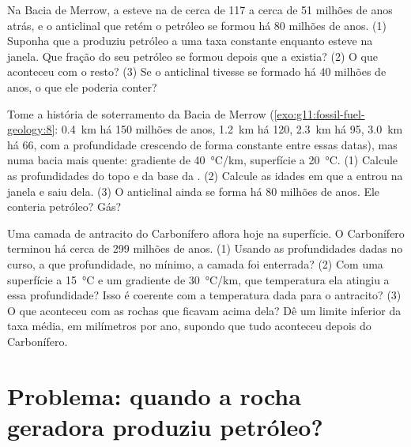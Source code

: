 \begin{exercise}[$\star\star\star$]\label{exo:g11:fossil-fuel-geology:13}
Na Bacia de Merrow, a  esteve na  de cerca
de 117 a cerca de 51 milhões de anos atrás, e o anticlinal que retém o
petróleo se formou há 80 milhões de anos. (1) Suponha que a 
produziu petróleo a uma taxa constante enquanto esteve na janela. Que fração
do seu petróleo se formou depois que a  existia? (2) O que
aconteceu com o resto? (3) Se o anticlinal tivesse se formado há 40 milhões
de anos, o que ele poderia conter?
\end{exercise}

\begin{exercise}[$\star\star\star$]\label{exo:g11:fossil-fuel-geology:14}
Tome a história de soterramento da Bacia de Merrow (\cref{exo:g11:fossil-fuel-geology:8}:
\qty{0.4}{km} há 150 milhões de anos, \qty{1.2}{km} há 120, \qty{2.3}{km}
há 95, \qty{3.0}{km} há 66, com a profundidade crescendo de forma
constante entre essas datas), mas numa bacia mais quente: gradiente de
\qty{40}{\degreeCelsius/km}, superfície a \qty{20}{\degreeCelsius}.
(1) Calcule as profundidades do topo e da base da .
(2) Calcule as idades em que a  entrou na janela e saiu dela.
(3) O anticlinal ainda se forma há 80 milhões de anos. Ele conteria
petróleo? Gás?
\end{exercise}

\begin{exercise}[$\star\star\star$]\label{exo:g11:fossil-fuel-geology:15}
Uma camada de antracito do Carbonífero aflora hoje na superfície. O
Carbonífero terminou há cerca de 299 milhões de anos. (1) Usando as
profundidades dadas no curso, a que profundidade, no mínimo, a camada foi
enterrada? (2) Com uma superfície a \qty{15}{\degreeCelsius} e um gradiente
de \qty{30}{\degreeCelsius/km}, que temperatura ela atingiu a essa
profundidade? Isso é coerente com a temperatura dada para o antracito?
(3) O que aconteceu com as rochas que ficavam acima dela? Dê um limite
inferior da taxa média, em milímetros por ano, supondo que tudo aconteceu
depois do Carbonífero.
\end{exercise}

\section{Problema: quando a rocha geradora produziu petróleo?}

